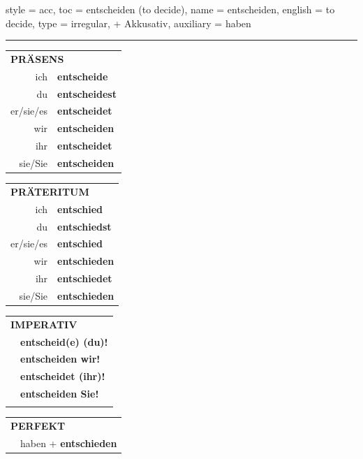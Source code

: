 \begin{verbentry}{
  style = {acc},
  toc = {entscheiden (to decide)},
  name = {entscheiden},
  english = {to decide},
  type = {irregular, + Akkusativ},
  auxiliary = {haben}
}
 
    
     \vspace{5pt}

    \hrule
    
    \vspace{5pt}

  \begin{tabular}{rl}
     \multicolumn{2}{l}{\textbf{PRÄSENS} }\\
    ich & \textbf{entscheide}\\
    du & \textbf{entscheidest}\\
    er/sie/es & \textbf{entscheidet}\\
    wir & \textbf{entscheiden}\\
    ihr & \textbf{entscheidet}\\
    sie/Sie & \textbf{entscheiden}\\
  \end{tabular}
  \hfill
     \begin{tabular}{rl}
    \multicolumn{2}{l}{\textbf{PRÄTERITUM} }\\
    ich & \textbf{entschied}\\
    du & \textbf{entschiedst}\\
    er/sie/es & \textbf{entschied}\\
    wir & \textbf{entschieden}\\
    ihr & \textbf{entschiedet}\\
    sie/Sie & \textbf{entschieden}\\
  \end{tabular}
  \hfill
  \begin{tabular}{rl}
     \multicolumn{2}{l}{\textbf{IMPERATIV} }\\
   & \textbf{entscheid(e) (du)!}\\
   & \textbf{entscheiden wir!}\\
   & \textbf{entscheidet (ihr)!}\\
   & \textbf{entscheiden Sie!}\\
   & \vspace{10pt}
  \end{tabular}

    \vspace{10pt}

 \begin{tabular}{rl}
     \multicolumn{2}{l}{\textbf{PERFEKT}}\\
  &  haben + \textbf{entschieden}\\
  \end{tabular}
\hfill
   \begin{tabular}{rl}
   

\end{tabular}
\end{verbentry}
